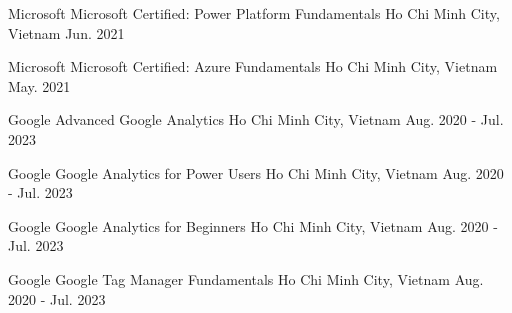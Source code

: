 


\begin{cventries}


\cventry
{Microsoft}
{Microsoft Certified: Power Platform Fundamentals}
{Ho Chi Minh City, Vietnam}
{Jun. 2021}
{
\begin{cvitems}
\end{cvitems}
}


\cventry
{Microsoft}
{Microsoft Certified: Azure Fundamentals}
{Ho Chi Minh City, Vietnam}
{May. 2021}
{
\begin{cvitems}
\end{cvitems}
}


\cventry
{Google}
{Advanced Google Analytics}
{Ho Chi Minh City, Vietnam}
{Aug. 2020 - Jul. 2023}
{
\begin{cvitems}
\end{cvitems}
}


\cventry
{Google}
{Google Analytics for Power Users}
{Ho Chi Minh City, Vietnam}
{Aug. 2020 - Jul. 2023}
{
\begin{cvitems}
\end{cvitems}
}


\cventry
{Google}
{Google Analytics for Beginners}
{Ho Chi Minh City, Vietnam}
{Aug. 2020 - Jul. 2023}
{
\begin{cvitems}
\end{cvitems}
}


\cventry
{Google}
{Google Tag Manager Fundamentals}
{Ho Chi Minh City, Vietnam}
{Aug. 2020 - Jul. 2023}
{
\begin{cvitems}
\end{cvitems}
}


\end{cventries}
